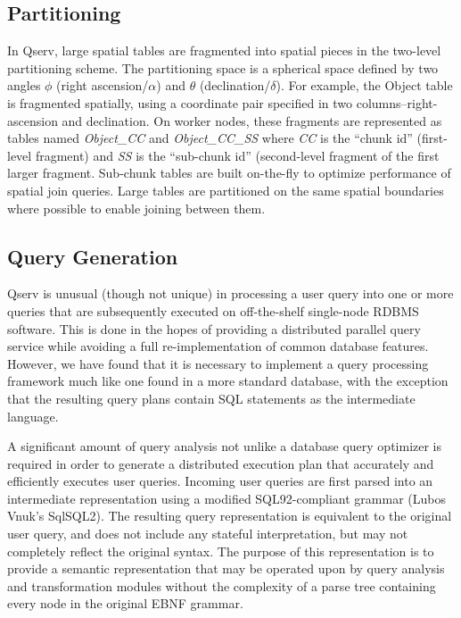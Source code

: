 \documentclass[DM,lsstdraft,toc]{lsstdoc}
\begin{document}
\subsection{Partitioning}\label{partitioning-1}

In Qserv, large spatial tables are fragmented into spatial pieces in the
two-level partitioning scheme. The partitioning space is a spherical
space defined by two angles $\phi$ (right ascension/$\alpha$) and $\theta$ (declination/$\delta$).
For example, the Object table is fragmented spatially, using a
coordinate pair specified in two columns--right-ascension and
declination. On worker nodes, these fragments are represented as tables
named \emph{Object\_CC} and \emph{Object\_CC\_SS} where \emph{CC} is the
``chunk id'' (first-level fragment) and \emph{SS} is the ``sub-chunk
id'' (second-level fragment of the first larger fragment. Sub-chunk
tables are built on-the-fly to optimize performance of spatial join
queries. Large tables are partitioned on the same spatial boundaries
where possible to enable joining between them.

\subsection{Query Generation}\label{query-generation}

Qserv is unusual (though not unique) in processing a user query into one
or more queries that are subsequently executed on off-the-shelf
single-node RDBMS software. This is done in the hopes of providing a
distributed parallel query service while avoiding a full
re-implementation of common database features. However, we have found
that it is necessary to implement a query processing framework much like
one found in a more standard database, with the exception that the
resulting query plans contain SQL statements as the intermediate
language.

A significant amount of query analysis not unlike a database query
optimizer is required in order to generate a distributed execution plan
that accurately and efficiently executes user queries. Incoming user
queries are first parsed into an intermediate representation using a
modified SQL92-compliant grammar (Lubos Vnuk's SqlSQL2). The resulting
query representation is equivalent to the original user query, and does
not include any stateful interpretation, but may not completely reflect
the original syntax. The purpose of this representation is to provide a
semantic representation that may be operated upon by query analysis and
transformation modules without the complexity of a parse tree containing
every node in the original EBNF grammar.
\end{document}
